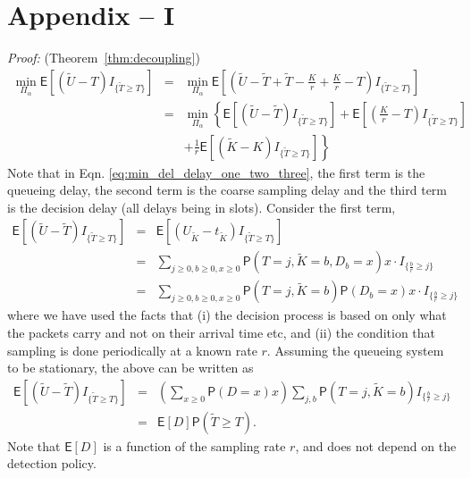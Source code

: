 \documentclass[acmtosn]{acmtrans2m}
\newcommand{\prob}[1]{\mathsf{P}\left(#1\right)}
\newcommand{\EXP}[1]{\mathsf{E}\!\left[#1\right]}
\newcommand{\MPA}{\min_{\Pi_{\alpha}}}
\begin{document}
\section*{Appendix -- I}
\emph{Proof:} (Theorem~\ref{thm:decoupling})
\begin{eqnarray}
\label{eq:min_det_delay}
 \MPA \EXP{\left(\widetilde{U}-T\right)I_{\{\widetilde{T}\geqslant T\}}} 
 & = & \MPA \EXP{(\widetilde{U}-\widetilde{T} + \widetilde{T} - \frac{K}{r} + \frac{K}{r} - T ) I_{\{\widetilde{T}\geqslant T\}} }\nonumber\\
\label{eq:min_del_delay_one_two_three}
 & = & \MPA \left\{ 
                \EXP{(\widetilde{U}-\widetilde{T}) I_{\{\widetilde{T}\geqslant T\}}}
             +  \EXP{\left(\frac{K}{r} - T \right) I_{\{\widetilde{T}\geqslant T\}}}\right.\nonumber\\
& &             + \left. \frac{1}{r}\EXP{\left(\widetilde{K} - K\right) I_{\{\widetilde{T}\geqslant T\}}} \right\}
\end{eqnarray}
Note that in Eqn. \ref{eq:min_del_delay_one_two_three}, the first term is the 
queueing delay, the second term is the coarse sampling delay and the third
term is the decision delay (all delays being in slots). Consider the first term,
\begin{eqnarray*}
 \EXP{(\widetilde{U}-\widetilde{T})I_{\{\widetilde{T}\geqslant T\}}}
& = & \EXP{(U_{\widetilde{K}}-t_{\widetilde{K}})I_{\{\widetilde{T}\geqslant T\}}}\\
& = &\sum_{j\ge0,b\ge0,x\ge0}\prob{T=j, \widetilde{K}=b, D_b=x}x\cdot I_{\{\frac{b}{r}\geqslant j\}}\\
& = &\sum_{j\ge0,b\ge0,x\ge0}\prob{T=j, \widetilde{K}=b}\prob{D_b=x}x\cdot I_{\{\frac{b}{r}\geqslant j\}}
\end{eqnarray*}
where we have used the facts that (i) the decision process is based on only
what the packets carry and not on their arrival time etc, and (ii) the condition 
that sampling is done periodically at a known rate $r$. Assuming the queueing 
system to be stationary, the above can be written as
\begin{eqnarray*}
 \EXP{(\widetilde{U}-\widetilde{T})I_{\{\widetilde{T}\geqslant T\}}}
& = & \left(\sum_{x\ge0} \prob{D=x}x \right) \sum_{j,b}\prob{T=j, \widetilde{K}=b}I_{\{\frac{b}{r}\geqslant j\}}\\
& = & \EXP{D}\prob{\widetilde{T}\geqslant T}.
\end{eqnarray*}
Note that $\EXP{D}$ is a function of the sampling rate $r$, and does not depend on
the detection policy. 
\end{document}
